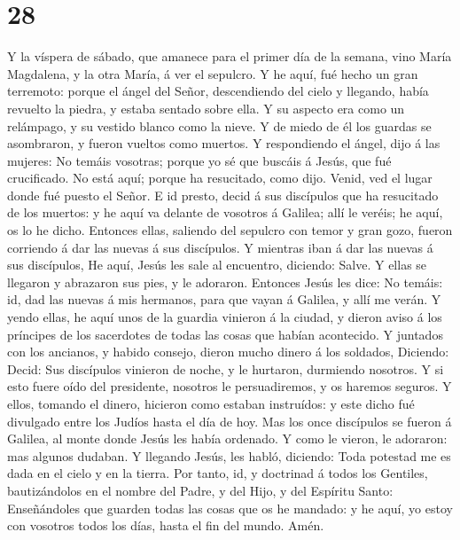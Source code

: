 \hypertarget{section-27}{%
\section{28}\label{section-27}}

 Y la víspera de sábado, que amanece para el primer día de
la semana, vino María Magdalena, y la otra María, á ver el sepulcro.
 Y he aquí, fué hecho un gran terremoto: porque el ángel
del Señor, descendiendo del cielo y llegando, había revuelto la piedra,
y estaba sentado sobre ella.  Y su aspecto era como un
relámpago, y su vestido blanco como la nieve.  Y de miedo
de él los guardas se asombraron, y fueron vueltos como muertos.
 Y respondiendo el ángel, dijo á las mujeres: No temáis
vosotras; porque yo sé que buscáis á Jesús, que fué crucificado.
 No está aquí; porque ha resucitado, como dijo. Venid, ved
el lugar donde fué puesto el Señor.  E id presto, decid á
sus discípulos que ha resucitado de los muertos: y he aquí va delante de
vosotros á Galilea; allí le veréis; he aquí, os lo he dicho.
 Entonces ellas, saliendo del sepulcro con temor y gran
gozo, fueron corriendo á dar las nuevas á sus discípulos. Y mientras
iban á dar las nuevas á sus discípulos,  He aquí, Jesús
les sale al encuentro, diciendo: Salve. Y ellas se llegaron y abrazaron
sus pies, y le adoraron.  Entonces Jesús les dice: No
temáis: id, dad las nuevas á mis hermanos, para que vayan á Galilea, y
allí me verán.  Y yendo ellas, he aquí unos de la guardia
vinieron á la ciudad, y dieron aviso á los príncipes de los sacerdotes
de todas las cosas que habían acontecido.  Y juntados con
los ancianos, y habido consejo, dieron mucho dinero á los soldados,
 Diciendo: Decid: Sus discípulos vinieron de noche, y le
hurtaron, durmiendo nosotros.  Y si esto fuere oído del
presidente, nosotros le persuadiremos, y os haremos seguros.
 Y ellos, tomando el dinero, hicieron como estaban
instruídos: y este dicho fué divulgado entre los Judíos hasta el día de
hoy.  Mas los once discípulos se fueron á Galilea, al
monte donde Jesús les había ordenado.  Y como le vieron,
le adoraron: mas algunos dudaban.  Y llegando Jesús, les
habló, diciendo: Toda potestad me es dada en el cielo y en la tierra.
 Por tanto, id, y doctrinad á todos los Gentiles,
bautizándolos en el nombre del Padre, y del Hijo, y del Espíritu Santo:
 Enseñándoles que guarden todas las cosas que os he
mandado: y he aquí, yo estoy con vosotros todos los días, hasta el fin
del mundo. Amén.
